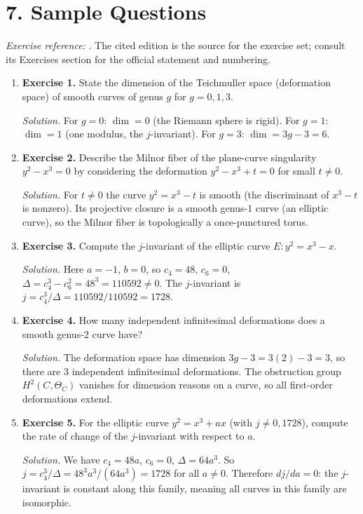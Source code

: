 \section*{7. Sample Questions}
\emph{Exercise reference:} \cite{deformation_theory_ref1}. The cited edition is the source for the exercise set; consult its Exercises section for the official statement and numbering.
\begin{enumerate}[leftmargin=*,itemsep=0.9em]

\item \textbf{Exercise 1.} State the dimension of the Teichmuller space (deformation space) of smooth curves of genus $g$ for $g=0,1,3$.

\emph{Solution.} For $g=0$: $\dim=0$ (the Riemann sphere is rigid). For $g=1$: $\dim=1$ (one modulus, the $j$-invariant). For $g=3$: $\dim=3g-3=6$.

\item \textbf{Exercise 2.} Describe the Milnor fiber of the plane-curve singularity $y^2-x^3=0$ by considering the deformation $y^2-x^3+t=0$ for small $t\neq0$.

\emph{Solution.} For $t\neq0$ the curve $y^2=x^3-t$ is smooth (the discriminant of $x^3-t$ is nonzero). Its projective closure is a smooth genus-$1$ curve (an elliptic curve), so the Milnor fiber is topologically a once-punctured torus.

\item \textbf{Exercise 3.} Compute the $j$-invariant of the elliptic curve $E:y^2=x^3-x$.

\emph{Solution.} Here $a=-1$, $b=0$, so $c_4=48$, $c_6=0$, $\Delta=c_4^3-c_6^2=48^3=110592\neq0$. The $j$-invariant is $j=c_4^3/\Delta=110592/110592=1728$.

\item \textbf{Exercise 4.} How many independent infinitesimal deformations does a smooth genus-$2$ curve have?

\emph{Solution.} The deformation space has dimension $3g-3=3(2)-3=3$, so there are $3$ independent infinitesimal deformations. The obstruction group $H^2(C,\Theta_C)$ vanishes for dimension reasons on a curve, so all first-order deformations extend.

\item \textbf{Exercise 5.} For the elliptic curve $y^2=x^3+ax$ (with $j\neq0,1728$), compute the rate of change of the $j$-invariant with respect to $a$.

\emph{Solution.} We have $c_4=48a$, $c_6=0$, $\Delta=64a^3$. So $j=c_4^3/\Delta=48^3a^3/(64a^3)=1728$ for all $a\neq0$. Therefore $dj/da=0$: the $j$-invariant is constant along this family, meaning all curves in this family are isomorphic.

\end{enumerate}
